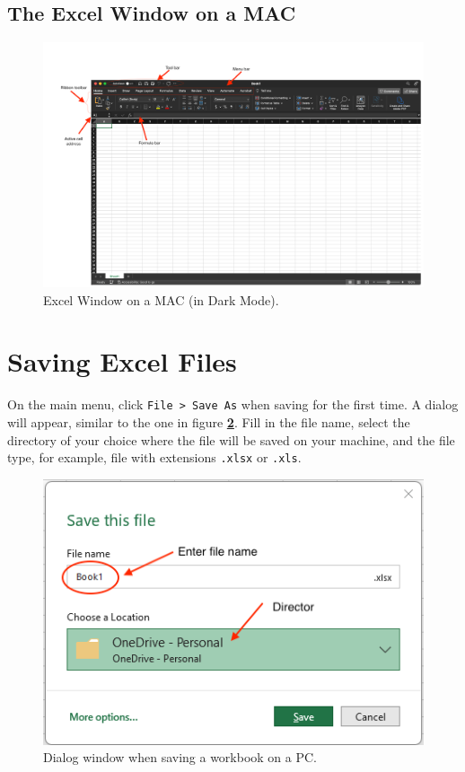 \documentclass[
  12pt,
  letterpaper,
]{book}
\begin{document}
\hypertarget{the-excel-window-on-a-mac}{%
\subsection{The Excel Window on a MAC}\label{the-excel-window-on-a-mac}}

\begin{figure}

{\centering \includegraphics[width=1\linewidth]{images/window-mac} 

}

\caption{Excel Window on a MAC (in Dark Mode).}\label{fig:window-mac}
\end{figure}

\hypertarget{saving-excel-files}{%
\section{Saving Excel Files}\label{saving-excel-files}}

On the main menu, click \texttt{File\ \textgreater{}\ Save\ As} when saving for the first time. A dialog will appear, similar to the one in figure \textbf{\ref{fig:saving-dialog-box-pc}}. Fill in the file name, select the directory of your choice where the file will be saved on your machine, and the file type, for example, file with extensions \texttt{.xlsx} or \texttt{.xls}.

\begin{figure}

{\centering \includegraphics[width=0.45\linewidth]{images/saving-pc2} 

}

\caption{Dialog window when saving a workbook on a PC.}\label{fig:saving-dialog-box-pc}
\end{figure}
\end{document}
